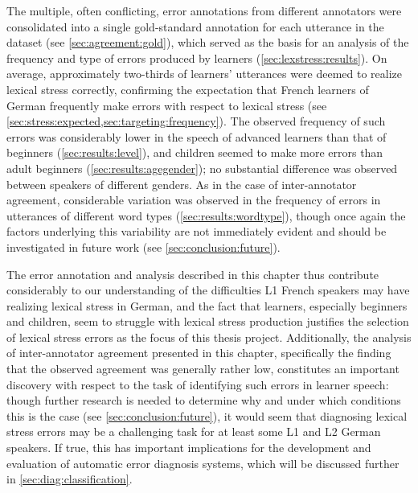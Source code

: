 	The multiple, often conflicting, error annotations from different annotators were consolidated into a single gold-standard annotation for each utterance in the dataset (see \cref{sec:agreement:gold}), which served as the basis for an analysis of the frequency and type of errors produced by learners (\cref{sec:lexstress:results}). 
	On average, approximately two-thirds of learners' utterances were deemed to realize lexical stress correctly, confirming the expectation that French learners of German frequently make errors with respect to lexical stress (see \cref{sec:stress:expected,sec:targeting:frequency}).
	The observed frequency of such errors was considerably lower in the speech of advanced learners than that of beginners (\cref{sec:results:level}), and children seemed to make more errors than adult beginners (\cref{sec:results:agegender}); no substantial difference was observed between speakers of different genders. 
	As in the case of inter-annotator agreement, considerable variation was observed in the frequency of errors in utterances of different word types (\cref{sec:results:wordtype}), though once again the factors underlying this variability are not immediately evident and should be investigated in future work (see \cref{sec:conclusion:future}).
	
	
	The error annotation and analysis described in this chapter thus contribute considerably to our understanding of the difficulties L1 French speakers may have realizing lexical stress in 
	German, 
	and the fact that learners, especially beginners and children, seem to struggle with lexical stress production justifies the selection of lexical stress errors as the focus of this thesis project. Additionally, the analysis of inter-annotator agreement presented in this chapter, specifically the finding that the observed agreement was generally rather low,
	constitutes an important discovery with respect to the task of identifying such errors in learner speech:
	though further research is needed to determine why and under which conditions this is the case (see \cref{sec:conclusion:future}), it would seem that diagnosing lexical stress errors may be a challenging task for at least some L1 and L2 German speakers. If true, this has important implications for the development and evaluation of automatic error diagnosis systems, 
	which
	will be discussed further in \cref{sec:diag:classification}.
	